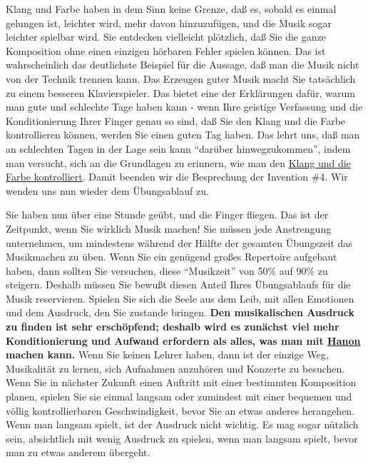 Klang und Farbe haben in dem Sinn keine Grenze, daß es, sobald es einmal gelungen ist, leichter wird, mehr davon hinzuzufügen, und die Musik sogar leichter spielbar wird.
Sie entdecken vielleicht plötzlich, daß Sie die ganze Komposition ohne einen einzigen hörbaren Fehler spielen können.
Das ist wahrscheinlich das deutlichste Beispiel für die Aussage, daß man die Musik nicht von der Technik trennen kann.
Das Erzeugen guter Musik macht Sie tatsächlich zu einem besseren Klavierspieler.
Das bietet eine der Erklärungen dafür, warum man gute und schlechte Tage haben kann - wenn Ihre geistige Verfassung und die Konditionierung Ihrer Finger genau so sind, daß Sie den Klang und die Farbe kontrollieren können, werden Sie einen guten Tag haben.
Das lehrt uns, daß man an schlechten Tagen in der Lage sein kann \enquote{darüber hinwegzukommen}, indem man versucht, sich an die Grundlagen zu erinnern, wie man den \hyperref[c1iii1]{Klang und die Farbe kontrolliert}.
Damit beenden wir die Besprechung der Invention \#4.
Wir wenden uns nun wieder dem Übungsablauf zu.

Sie haben nun über eine Stunde geübt, und die Finger fliegen.
Das ist der Zeitpunkt, wenn Sie wirklich Musik machen!
Sie müssen jede Anstrengung unternehmen, um mindestens während der Hälfte der gesamten Übungszeit das Musikmachen zu üben.
Wenn Sie ein genügend großes Repertoire aufgebaut haben, dann sollten Sie versuchen, diese \enquote{Musikzeit} von 50\% auf 90\% zu steigern.
Deshalb müssen Sie bewußt diesen Anteil Ihres Übungsablaufs für die Musik reservieren.
Spielen Sie sich die Seele aus dem Leib, mit allen Emotionen und dem Ausdruck, den Sie zustande bringen.
\textbf{Den musikalischen Ausdruck zu finden ist sehr erschöpfend; deshalb wird es zunächst viel mehr Konditionierung und Aufwand erfordern als alles, was man mit \hyperref[c1iii7h]{Hanon} machen kann.}
Wenn Sie keinen Lehrer haben, dann ist der einzige Weg, Musikalität zu lernen, sich Aufnahmen anzuhören und Konzerte zu besuchen.
Wenn Sie in nächster Zukunft einen Auftritt mit einer bestimmten Komposition planen, spielen Sie sie einmal langsam oder zumindest mit einer bequemen und völlig kontrollierbaren Geschwindigkeit, bevor Sie an etwas anderes herangehen.
Wenn man langsam spielt, ist der Ausdruck nicht wichtig.
Es mag sogar nützlich sein, absichtlich mit wenig Ausdruck zu spielen, wenn man langsam spielt, bevor man zu etwas anderem übergeht.

